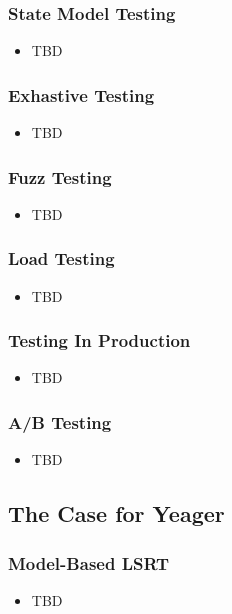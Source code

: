 \begin{frame}
  \frametitle{State Model Testing}
  \begin{itemize}
    \item TBD
  \end{itemize}
\end{frame}

\begin{frame}
  \frametitle{Exhastive Testing}
  \begin{itemize}
    \item TBD
  \end{itemize}
\end{frame}

\begin{frame}
  \frametitle{Fuzz Testing}
  \begin{itemize}
    \item TBD
  \end{itemize}
\end{frame}

\begin{frame}
  \frametitle{Load Testing}
  \begin{itemize}
    \item TBD
  \end{itemize}
\end{frame}

\begin{frame}
  \frametitle{Testing In Production}
  \begin{itemize}
    \item TBD
  \end{itemize}
\end{frame}

\begin{frame}
  \frametitle{A/B Testing}
  \begin{itemize}
    \item TBD
  \end{itemize}
\end{frame}

\subsection{The Case for Yeager}

\begin{frame}
  \frametitle{Model-Based LSRT}
  \begin{itemize}
    \item TBD
  \end{itemize}
\end{frame}

